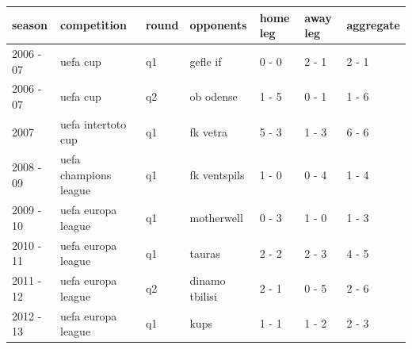 \documentclass{article}
\begin{document}
\begin{tabular}{lllllll}
\toprule
season & competition & round & opponents & home leg & away leg & aggregate \\
\midrule
2006 - 07 & uefa cup & q1 & gefle if & 0 - 0 & 2 - 1 & 2 - 1 \\
2006 - 07 & uefa cup & q2 & ob odense & 1 - 5 & 0 - 1 & 1 - 6 \\
2007 & uefa intertoto cup & q1 & fk vetra & 5 - 3 & 1 - 3 & 6 - 6 \\
2008 - 09 & uefa champions league & q1 & fk ventspils & 1 - 0 & 0 - 4 & 1 - 4 \\
2009 - 10 & uefa europa league & q1 & motherwell & 0 - 3 & 1 - 0 & 1 - 3 \\
2010 - 11 & uefa europa league & q1 & tauras & 2 - 2 & 2 - 3 & 4 - 5 \\
2011 - 12 & uefa europa league & q2 & dinamo tbilisi & 2 - 1 & 0 - 5 & 2 - 6 \\
2012 - 13 & uefa europa league & q1 & kups & 1 - 1 & 1 - 2 & 2 - 3 \\
\bottomrule
\end{tabular}
\end{document}
